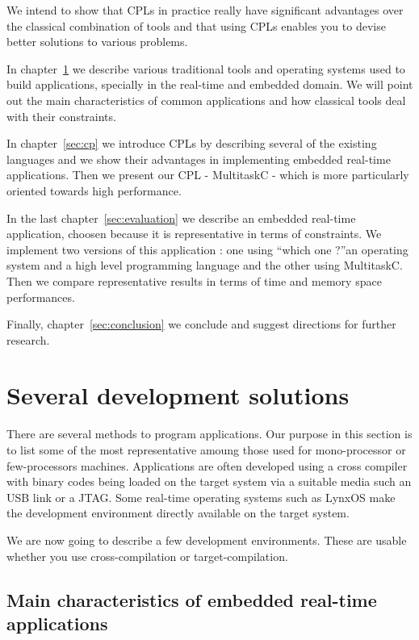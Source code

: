 \documentclass[10pt]{report}
\begin{document}
We intend to show that CPLs in practice really have significant 
advantages over the classical combination of tools and that using 
CPLs enables you to devise better solutions to various problems.

In chapter~\ref{sec:related} we describe various traditional tools 
and operating systems used to build applications, specially in 
the real-time and embedded domain. We will point out the main 
characteristics of common applications and how classical tools 
deal with their constraints.

In chapter~\ref{sec:cp}  we introduce CPLs by describing several of 
the existing languages and we show their advantages in 
implementing embedded real-time applications. Then we present our 
CPL - MultitaskC - which is more particularly oriented towards 
high performance.

In the last chapter~\ref{sec:evaluation} we describe an embedded 
real-time application, choosen because it is representative in 
terms of constraints. We implement two versions of this 
application : one using “which one ?”an operating system and a 
high level programming language and the other using MultitaskC. 
Then we compare representative results in terms of time and 
memory space performances.

Finally, chapter~\ref{sec:conclusion} we conclude and suggest 
directions for further research.

\chapter{Several development solutions}
\label{sec:related}

There are several methods to program applications. Our purpose in 
this section is to list some of the most representative amoung 
those used for mono-processor or few-processors machines. 
Applications are often developed using a cross compiler with 
binary codes being loaded on the target system via a suitable 
media such an USB link or a JTAG. Some real-time operating 
systems such as LynxOS make the development environment directly 
available on the target system.

We are now going to describe a few development environments. 
These are usable whether you use cross-compilation or 
target-compilation.

\section{Main characteristics of embedded real-time applications}
\end{document}
